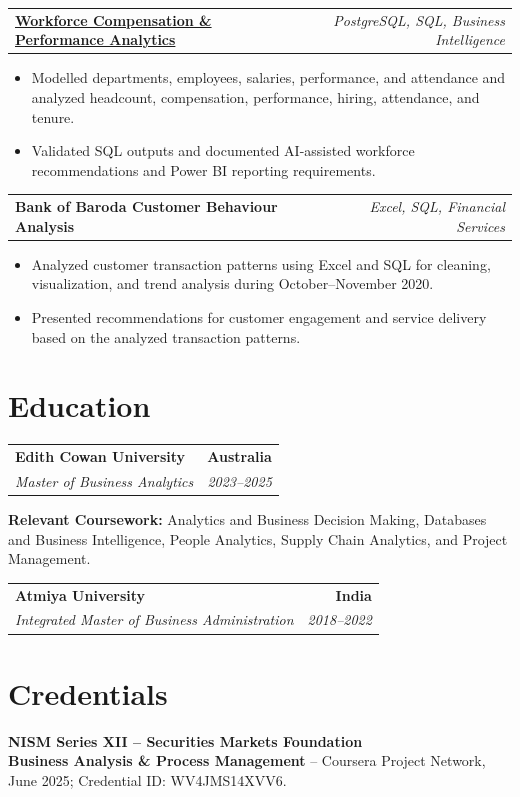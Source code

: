 \documentclass[letterpaper,10pt]{article}
\makeatletter
\newcommand{\role}[4]{%
  \begin{tabularx}{\textwidth}{@{}Xr@{}}
    \textbf{#1} & \textbf{#2} \\
    \textit{#3} & \textit{#4}
  \end{tabularx}\vspace{-1pt}
}
\newcommand{\project}[2]{%
  \begin{tabularx}{\textwidth}{@{}Xr@{}}
    \textbf{#1} & \textit{#2}
  \end{tabularx}\vspace{-1pt}
}
\makeatother
\begin{document}
\project{\href{https://github.com/jainalimehta/HR-Analytics}{Workforce Compensation \& Performance Analytics}}{PostgreSQL, SQL, Business Intelligence}
\begin{itemize}
  \item Modelled departments, employees, salaries, performance, and attendance and analyzed headcount, compensation, performance, hiring, attendance, and tenure.
  \item Validated SQL outputs and documented AI-assisted workforce recommendations and Power BI reporting requirements.
\end{itemize}
\vspace{1pt}

\project{Bank of Baroda Customer Behaviour Analysis}{Excel, SQL, Financial Services}
\begin{itemize}
  \item Analyzed customer transaction patterns using Excel and SQL for cleaning, visualization, and trend analysis during October--November 2020.
  \item Presented recommendations for customer engagement and service delivery based on the analyzed transaction patterns.
\end{itemize}

\section{Education}
\role{Edith Cowan University}{Australia}{Master of Business Analytics}{2023--2025}
\small\textbf{Relevant Coursework:} Analytics and Business Decision Making, Databases and Business Intelligence, People Analytics, Supply Chain Analytics, and Project Management.\\[2pt]
\role{Atmiya University}{India}{Integrated Master of Business Administration}{2018--2022}

\section{Credentials}
\small\textbf{NISM Series XII -- Securities Markets Foundation}\\[-0.2pt]
\small\textbf{Business Analysis \& Process Management} -- Coursera Project Network, June 2025; Credential ID: WV4JMS14XVV6.
\end{document}
